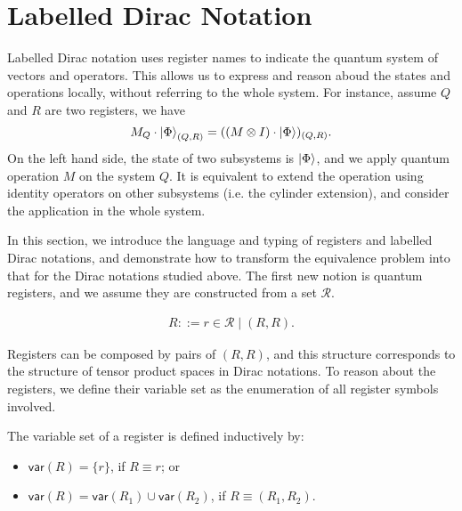 


\newcommand{\var}{\mathsf{var}}
\newcommand{\reg}{\mathsf{Reg}}
\newcommand{\DType}{\mathcal{D}}
\newcommand{\cR}{\mathcal{R}}
\newcommand{\cN}{\mathcal{N}}
\newcommand{\tD}{\tilde{D}}
\newcommand{\te}{\tilde{e}}
\newcommand{\tT}{\tilde{T}}
\newcommand{\tADD}{\widetilde{ADD}}
\newcommand{\bU}{\mathbf{U}}
\newcommand{\<}{\langle}
\newcommand{\simp}{\mathsf{Simp}}
\newcommand{\List}{\mathsf{list}}
\renewcommand{\>}{\rangle}


\section{Labelled Dirac Notation}
\label{sec: labelled}
Labelled Dirac notation uses register names to indicate the quantum system of vectors and operators. This allows us to express and reason aboud the states and operations locally, without referring to the whole system. For instance, assume $Q$ and $R$ are two registers, we have
\[
    M_Q \cdot \ket{\Phi}_{(Q, R)} = ((M \otimes I) \cdot \ket{\Phi})_{(Q, R)}.
\]
On the left hand side, the state of two subsystems is $\ket{\Phi}$, and we apply quantum operation $M$ on the system $Q$. It is equivalent to extend the operation using identity operators on other subsystems (i.e. the cylinder extension), and consider the application in the whole system.


In this section, we introduce the language and typing of registers and labelled Dirac notations, and demonstrate how to transform the equivalence problem into that for the Dirac notations studied above.
The first new notion is quantum registers, and we assume they are constructed from a set $\cR$.
\begin{definition}
  \begin{align*}
    R ::= r\in\cR \mid (R, R).
  \end{align*}
\end{definition}

Registers can be composed by pairs of $(R, R)$, and this structure corresponds to the structure of tensor product spaces in Dirac notations.
To reason about the registers, we define their variable set as the enumeration of all register symbols involved.

\begin{definition}
The variable set of a register is defined inductively by:
\begin{itemize}
    \item $\var(R) = \{r\}$, if $R\equiv r$; or
    \item $\var(R) = \var(R_1) \cup\var(R_2)$, if $R\equiv (R_1,R_2)$.
\end{itemize}
\end{definition}

